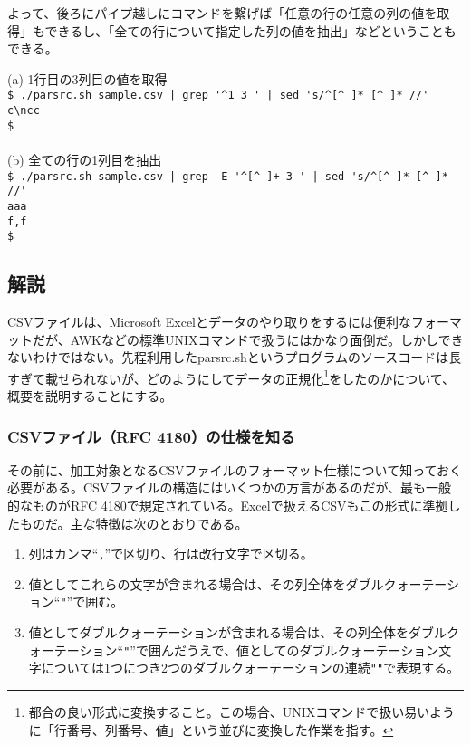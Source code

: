 よって、後ろにパイプ越しにコマンドを繋げば「任意の行の任意の列の値を取得」もできるし、「全ての行について指定した列の値を抽出」などということもできる。
\begin{screen}
	(a) 1行目の3列目の値を取得 \\
	\verb!$ ./parsrc.sh sample.csv | grep '^1 3 ' | sed 's/^[^ ]* [^ ]* //'! \return \\
	\verb|c\ncc| \\
	\verb|$ | \\
	\\
	(b) 全ての行の1列目を抽出 \\
	\verb!$ ./parsrc.sh sample.csv | grep -E '^[^ ]+ 3 ' | sed 's/^[^ ]* [^ ]* //'! \return \\
	\verb|aaa    | \\
	\verb|f,f    | \\
	\verb|$ |
\end{screen}

\subsection*{解説}

CSVファイルは、Microsoft Excelとデータのやり取りをするには便利なフォーマットだが、AWKなどの標準UNIXコマンドで扱うにはかなり面倒だ。しかしできないわけではない。先程利用したparsrc.shというプログラムのソースコードは長すぎて載せられないが、どのようにしてデータの正規化\footnote{都合の良い形式に変換すること。この場合、UNIXコマンドで扱い易いように「行番号、列番号、値」という並びに変換した作業を指す。}をしたのかについて、概要を説明することにする。

\subsubsection*{CSVファイル（RFC 4180）の仕様を知る}

その前に、加工対象となるCSVファイルのフォーマット仕様について知っておく必要がある。CSVファイルの構造にはいくつかの方言があるのだが、最も一般的なものがRFC 4180で規定されている。Excelで扱えるCSVもこの形式に準拠したものだ。主な特徴は次のとおりである。
\begin{enumerate}
  \item 列はカンマ``\verb|,|''で区切り、行は改行文字で区切る。
  \item 値としてこれらの文字が含まれる場合は、その列全体をダブルクォーテーション``\verb|"|''で囲む。
  \item 値としてダブルクォーテーションが含まれる場合は、その列全体をダブルクォーテーション``\verb|"|''で囲んだうえで、値としてのダブルクォーテーション文字については1つにつき2つのダブルクォーテーションの連続\verb|""|で表現する。
\end{enumerate}

